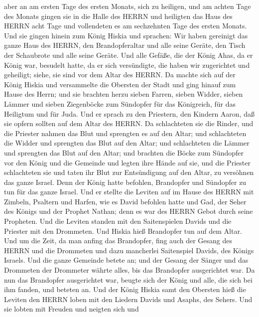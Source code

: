 aber an am ersten Tage des ersten Monats, sich zu heiligen, und am
achten Tage des Monats gingen sie in die Halle des HERRN und heiligten
das Haus des HERRN acht Tage und vollendeten es am sechzehnten Tage des
ersten Monats.  Und sie gingen hinein zum König Hiskia und
sprachen: Wir haben gereinigt das ganze Haus des HERRN, den
Brandopferaltar und alle seine Geräte, den Tisch der Schaubrote und alle
seine Geräte.  Und alle Gefäße, die der König Ahas, da er
König war, besudelt hatte, da er sich versündigte, die haben wir
zugerichtet und geheiligt; siehe, sie sind vor dem Altar des HERRN.
 Da machte sich auf der König Hiskia und versammelte die
Obersten der Stadt und ging hinauf zum Hause des Herrn; 
und sie brachten herzu sieben Farren, sieben Widder, sieben Lämmer und
sieben Ziegenböcke zum Sündopfer für das Königreich, für das Heiligtum
und für Juda. Und er sprach zu den Priestern, den Kindern Aaron, daß sie
opfern sollten auf dem Altar des HERRN.  Da schlachteten
sie die Rinder, und die Priester nahmen das Blut und sprengten es auf
den Altar; und schlachteten die Widder und sprengten das Blut auf den
Altar; und schlachteten die Lämmer und sprengten das Blut auf den Altar;
 und brachten die Böcke zum Sündopfer vor den König und die
Gemeinde und legten ihre Hände auf sie,  und die Priester
schlachteten sie und taten ihr Blut zur Entsündigung auf den Altar, zu
versöhnen das ganze Israel. Denn der König hatte befohlen, Brandopfer
und Sündopfer zu tun für das ganze Israel.  Und er stellte
die Leviten auf im Hause des HERRN mit Zimbeln, Psaltern und Harfen, wie
es David befohlen hatte und Gad, der Seher des Königs und der Prophet
Nathan; denn es war des HERRN Gebot durch seine Propheten. 
Und die Leviten standen mit den Saitenspielen Davids und die Priester
mit den Drommeten.  Und Hiskia hieß Brandopfer tun auf dem
Altar. Und um die Zeit, da man anfing das Brandopfer, fing auch der
Gesang des HERRN und die Drommeten und dazu mancherlei Saitenspiel
Davids, des Königs Israels.  Und die ganze Gemeinde betete
an; und der Gesang der Sänger und das Drommeten der Drommeter währte
alles, bis das Brandopfer ausgerichtet war.  Da nun das
Brandopfer ausgerichtet war, beugte sich der König und alle, die sich
bei ihm fanden, und beteten an.  Und der König Hiskia samt
den Obersten hieß die Leviten den HERRN loben mit den Liedern Davids und
Asaphs, des Sehers. Und sie lobten mit Freuden und neigten sich und
